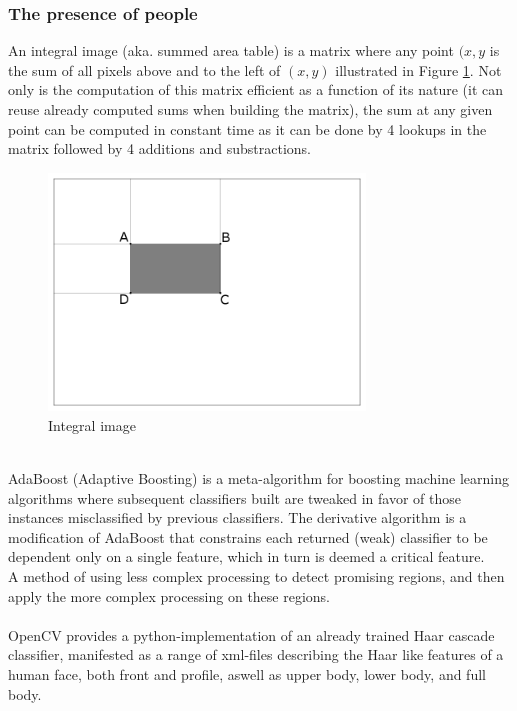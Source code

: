 \subsubsection{The presence of people}
%
%
An integral image (aka. summed area table) is a matrix where any point $(x,y$ is the sum of all pixels above and to the left of $(x,y)$ illustrated in Figure \ref{fig:integral_img}. Not only is the computation of this matrix efficient as a function of its nature (it can reuse already computed sums when building the matrix), the sum at any given point can be computed in constant time as it can be done by 4 lookups in the matrix followed by 4 additions and substractions.
%
\begin{figure}[h]
     \centering
     \includegraphics[width=0.75\textwidth]{img/integral_image.png}
     \caption{Integral image}\label{fig:integral_img}
\end{figure}\\
%
AdaBoost (Adaptive Boosting) is a meta-algorithm for boosting machine learning algorithms where subsequent classifiers built are tweaked in favor of those instances misclassified by previous classifiers. The derivative algorithm is a modification of AdaBoost that constrains each returned (weak) classifier to be dependent only on a single feature, which in turn is deemed a critical feature.\\
A method of using less complex processing to detect promising regions, and then apply the more complex processing on these regions.\\\\
%
OpenCV provides a python-implementation of an already trained Haar cascade classifier, manifested as a range of xml-files describing the Haar like features of a human face, both front and profile, aswell as upper body, lower body, and full body.\\
